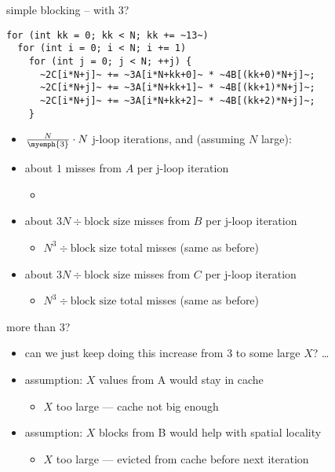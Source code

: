 \begin{frame}[fragile,label=cacheBlockKLoadsAlt]{simple blocking -- with 3?}
\begin{lstlisting}
for (int kk = 0; kk < N; kk += ~13~)
  for (int i = 0; i < N; i += 1)
    for (int j = 0; j < N; ++j) {
      ~2C[i*N+j]~ += ~3A[i*N+kk+0]~ * ~4B[(kk+0)*N+j]~;
      ~2C[i*N+j]~ += ~3A[i*N+kk+1]~ * ~4B[(kk+1)*N+j]~;
      ~2C[i*N+j]~ += ~3A[i*N+kk+2]~ * ~4B[(kk+2)*N+j]~;
    }
\end{lstlisting}
\begin{itemize}
\item $\frac{N}{\myemph{3}}\cdot N$ j-loop iterations, and (assuming $N$ large):
\item about $1$ misses from $A$ per j-loop iteration
    \begin{itemize}
    \item {}
    \end{itemize}
\item about $3N\div\text{block size}$ misses from $B$ per j-loop iteration
    \begin{itemize}
    \item $N^3\div\text{block size}$ total misses (same as before)
    \end{itemize}
\item about $3N\div\text{block size}$ misses from $C$ per j-loop iteration
    \begin{itemize}
    \item $N^3\div\text{block size}$ total misses (same as before)
    \end{itemize}
\end{itemize}
\end{frame}

\begin{frame}{more than 3?}
    \begin{itemize}
    \item can we just keep doing this increase from 3 to some large $X$?
    \ldots
    \item assumption: $X$ values from A would stay in cache
        \begin{itemize}
        \item $X$ too large --- cache not big enough
        \end{itemize}
    \item assumption: $X$ blocks from B would help with spatial locality
        \begin{itemize}
        \item $X$ too large --- evicted from cache before next iteration
        \end{itemize}
    \end{itemize}
\end{frame}
